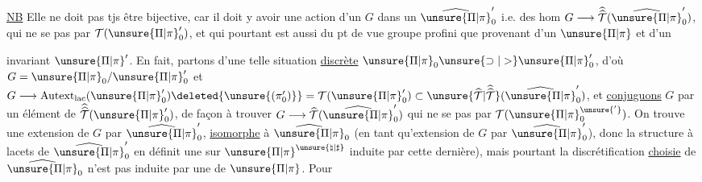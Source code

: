 \uline{NB} Elle ne doit pas tjs être bijective,
car il doit y avoir une action  d'un
\(G\) dans un \(\widehat{\unsure{\Pi|\pi}}'_0\) i.e. des hom
\(G\longrightarrow\widehat{\widehat{\mathcal T}}(\widehat{\unsure{\Pi|\pi}}'_0)\), qui ne se  pas
par \(\mathcal T(\unsure{\Pi|\pi}'_0)\), et qui pourtant est aussi
 du pt de vue groupe profini que
 provenant d'un \(\unsure{\Pi|\pi}\) et d'un 

invariant $\unsure{\Pi|\pi}'$. En fait, partons d'une telle situation \uline{discrète} $\unsure{\Pi|\pi}_0 \unsure{\supset|>} \unsure{\Pi|\pi}'_0$, d'où $G=\unsure{\Pi|\pi}_0/\unsure{\Pi|\pi}'_0$ et $G\longrightarrow \operatorname{Autext}_{\mathrm{lac}}(\unsure{\Pi|\pi}'_0)\deleted{\unsure{(\pi'_0)}}=\mathcal T(\unsure{\Pi|\pi}'_0)\subset\unsure{\widehat{\mathcal T}|\widehat{\widehat{\mathcal T}}}(\widehat{\unsure{\Pi|\pi}}'_0)$, et \uline{conjuguons} $G$ par un élément \inserted{$\gamma$} de $\widehat{\widehat{\mathcal T}}(\unsure{\Pi|\pi}'_0)$, de façon à trouver $G\longrightarrow\widehat{\mathcal T}(\widehat{\unsure{\Pi|\pi}}'_0)$ qui ne  se  pas par $\mathcal T(\unsure{\Pi|\pi}^{\unsure{'}}_0)$. On trouve une extension \inserted{$\unsure{\widehat{\unsure{\Pi|\pi}}|\unsure{\Pi|\pi}}^{\unsure{\natural|\sharp}}$} de $G$ par $\widehat{\unsure{\Pi|\pi}}'_0$, \uline{isomorphe} à $\widehat{\unsure{\Pi|\pi}}_0$ (en tant qu'extension de $G$ par $\widehat{\unsure{\Pi|\pi}}'_0$), donc la structure à lacets de $\widehat{\unsure{\Pi|\pi}}'_0$ en définit une sur $\unsure{\Pi|\pi}^{\unsure{\natural|\sharp}}$   induite par cette dernière), mais pourtant la discrétification \uline{choisie}  de $\widehat{\unsure{\Pi|\pi}}_0$ n'est pas induite par une de $\unsure{\Pi|\pi}$. Pour

